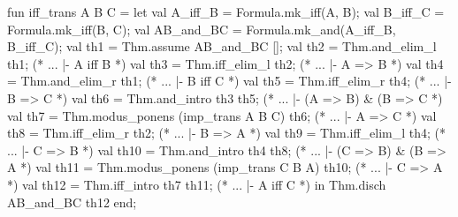 \nwenddocs{}\endmoddef\nwstartdeflinemarkup{}\nwenddeflinemarkup
fun iff_trans A B C =
  let
    val A_iff_B = Formula.mk_iff(A, B);
    val B_iff_C = Formula.mk_iff(B, C);
    val AB_and_BC = Formula.mk_and(A_iff_B, B_iff_C);
    val th1 = Thm.assume AB_and_BC [];
    val th2 = Thm.and_elim_l th1; (* ... |- A iff B *)
    val th3 = Thm.iff_elim_l th2; (* ... |- A => B *)
    val th4 = Thm.and_elim_r th1; (* ... |- B iff C *)
    val th5 = Thm.iff_elim_r th4; (* ... |- B => C *)
    val th6 = Thm.and_intro th3 th5; (* ... |- (A => B) & (B => C *)
    val th7 = Thm.modus_ponens (imp_trans A B C) th6; (* ... |- A => C *)
    val th8 = Thm.iff_elim_r th2; (* ... |- B => A *)
    val th9 = Thm.iff_elim_l th4; (* ... |- C => B *)
    val th10 = Thm.and_intro th4 th8; (* ... |- (C => B) & (B => A *)
    val th11 = Thm.modus_ponens (imp_trans C B A) th10; (* ... |- C => A *)
    val th12 = Thm.iff_intro th7 th11; (* ... |- A iff C *)
  in
    Thm.disch AB_and_BC th12
  end;
\eatline
